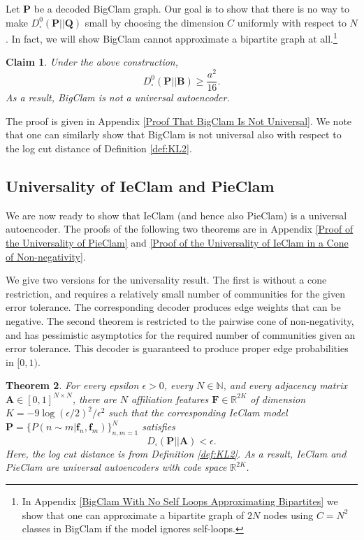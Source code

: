 \documentclass[letterpaper]{article} %
\newtheorem{theorem}{Theorem}
\newtheorem{claim}[theorem]{Claim}
\begin{document}
Let $\mathbf{P}$ be a decoded BigClam graph. 
Our goal is to show that there is no way to make $D^0_{\square}(\mathbf{P} || \mathbf{Q})$ small by choosing the dimension $C$ uniformly with respect to $N$. In fact, we will show BigClam cannot approximate a bipartite graph at all.\footnote{In Appendix \ref{BigClam With No Self Loops Approximating Bipartites} we show that one can approximate a bipartite graph of $2N$ nodes using $C=N^2$ classes in BigClam if the model ignores self-loops.} 

\begin{claim}
\label{claim:Clam_bi}
    Under the above construction, 
    \[D^0_{\square}(\mathbf{P} || \mathbf{B}) \geq \frac{a^2}{16}.\]
    As a result, BigClam is not a universal autoencoder.
\end{claim}
The proof is given in Appendix \ref{Proof That BigClam Is Not Universal}.
We note that one can similarly show that BigClam is not universal also with respect to the log cut distance of Definition \ref{def:KL2}.


\subsection{Universality of IeClam and PieClam}
We are now ready to show that IeClam (and hence also PieClam) is a universal autoencoder. The proofs of the following two theorems are in Appendix \ref{Proof of the Universality of PieClam} and \ref{Proof of the Universality of IeClam in a Cone of Non-negativity}.

We give two versions for the universality result. The first is without a cone restriction, and requires a relatively small number of communities for the given error tolerance. The corresponding decoder produces edge weights that can be negative. The second theorem is restricted to the pairwise cone of non-negativity, and has pessimistic  asymptotics for the required number of communities given an error tolerance. This decoder is guaranteed to produce proper edge probabilities in $[0,1)$.



\begin{theorem}
\label{thm:IEUniversality}
    For every epsilon $\epsilon>0$, every $N\in\mathbb{N}$, and every adjacency matrix $\mathbf{A}\in[0,1]^{N\times N}$, there are $N$ affiliation features $\mathbf{F}\in \mathbb{R}^{2K}$ of dimension  $K=-9\log(\epsilon/2)^2/\epsilon^2$ such that the corresponding IeClam model $\mathbf{P}=\{P(n\sim m|\mathbf{f}_n, \mathbf{f}_m)\}_{n,m=1}^N$ satisfies 
     \[D_{\square}(\mathbf{P} || \mathbf{A}) <\epsilon.\] 
    Here, the log cut distance is from Definition \ref{def:KL2}.
    As a result, 
    IeClam and PieClam are universal autoencoders with code space $\mathbb{R}^{2K}$.
\end{theorem}
\end{document}

